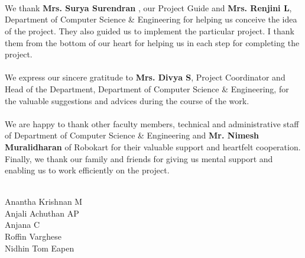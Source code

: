 \section*{ } %
 \\We thank \textbf{Mrs. Surya Surendran} , our Project Guide and \textbf{Mrs. Renjini L}, Department of Computer Science \& Engineering for helping us conceive the idea of the project. They also guided us to implement the particular project. I thank them from the bottom of our heart for helping us in each step for completing the project.\\
 \\
 We express our sincere gratitude to \textbf{Mrs. Divya S}, Project Coordinator and Head of the Department, Department of Computer Science \& Engineering, for the valuable suggestions and advices during the course of the work.\\
 \\We are happy to thank other faculty members, technical and administrative staff of  Department of Computer Science \& Engineering and \textbf{Mr. Nimesh Muralidharan} of Robokart for their valuable support and heartfelt cooperation.\\
 Finally, we thank our family and friends for giving us mental support and enabling us to work efficiently on the project.\\
\\
\begin{flushright}
 Anantha Krishnan M\\
 Anjali Achuthan AP\\
 Anjana C \\       
 Roffin Varghese\\                                                                          
 Nidhin Tom Eapen\\    

\end{flushright}